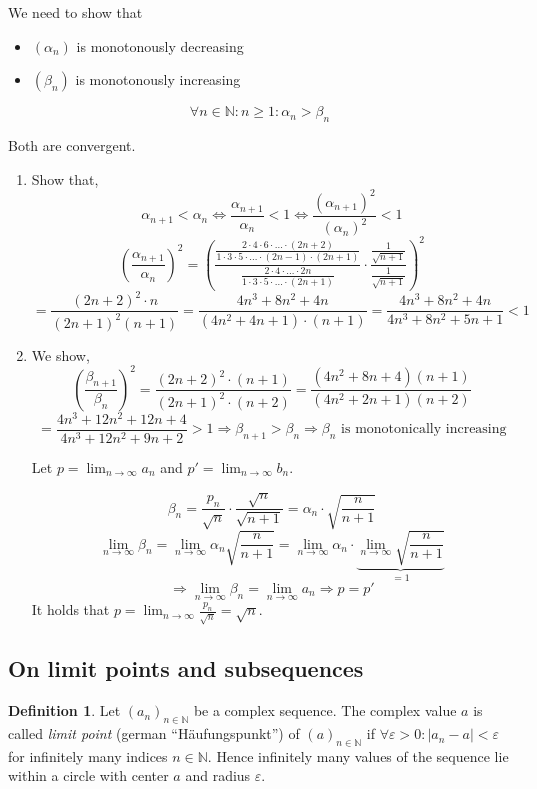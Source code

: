 \documentclass[a4paper,landscape,twocolumn]{article}
\theoremstyle{definition}
\newtheorem{defi}{Definition}
\newcommand\abs[1]{\left|#1\right|}
\newcommand\seq[1]{{\left(#1\right)}_{n \in \mathbb N}}
\begin{document}
We need to show that
\begin{itemize}
  \item $(\alpha_n)$ is monotonously decreasing
  \item $(\beta_n)$ is monotonously increasing
\end{itemize}
\[ \forall n \in \mathbb N: n \geq 1: \alpha_n > \beta_n \]

Both are convergent.

\begin{enumerate}
  \item Show that,
    \[
        \alpha_{n+1} < \alpha_n \Leftrightarrow
        \frac{\alpha_{n+1}}{\alpha_n} < 1 \Leftrightarrow
        \frac{(\alpha_{n+1})^2}{(\alpha_n)^2} < 1
    \] \[
        \left(\frac{\alpha_{n+1}}{\alpha_n}\right)^2 = \left(
            \frac{\frac{2 \cdot 4 \cdot 6 \cdot \ldots \cdot (2n+2)}{1 \cdot 3 \cdot 5 \cdot \ldots \cdot (2n-1) \cdot (2n+1)}}%
            {\frac{2\cdot4\cdot \ldots \cdot 2n}{1 \cdot 3 \cdot 5 \cdot \ldots \cdot (2n+1)}}
            \cdot \frac{\frac{1}{\sqrt{n+1}}}{\frac{1}{\sqrt{n+1}}}
        \right)^2
    \] \[
        = \frac{(2n+2)^2 \cdot n}{(2n+1)^2 (n + 1)}
        = \frac{4n^3+8n^2+4n}{(4n^2 + 4n + 1)\cdot(n+1)}
        = \frac{4n^3+8n^2+4n}{4n^3+8n^2+5n+1}
        < 1
    \]
  \item We show,
    \[
        \left(\frac{\beta_{n+1}}{\beta_n}\right)^2
        = \frac{(2n+2)^2 \cdot (n+1)}{(2n+1)^2 \cdot (n+2)}
        = \frac{(4n^2 + 8n + 4) (n+1)}{(4n^2+2n+1) (n+2)}
    \] \[
        = \frac{4n^3+12n^2+12n+4}{4n^3 + 12n^2 + 9n + 2}
        > 1 \Rightarrow \beta_{n+1} > \beta_n \Rightarrow \beta_n \text{ is monotonically increasing}
    \]

    Let $p = \lim_{n\to\infty} a_n$ and $p' = \lim_{n\to\infty} b_n$.

    \[ \beta_n = \frac{p_n}{\sqrt{n}} \cdot \frac{\sqrt{n}}{\sqrt{n+1}} = \alpha_n \cdot \sqrt{\frac{n}{n+1}} \]
    \[ \lim_{n\to\infty} \beta_n = \lim_{n\to\infty} \alpha_n \sqrt{\frac{n}{n+1}} = \lim_{n\to\infty} \alpha_n \cdot \underbrace{\lim_{n\to\infty} \sqrt{\frac{n}{n+1}}}_{=1} \]
    \[ \Rightarrow \lim_{n\to\infty} \beta_n = \lim_{n\to\infty} a_n \Rightarrow p = p' \]
    It holds that $p = \lim_{n\to\infty} \frac{p_n}{\sqrt{n}} = \sqrt{n}$.
\end{enumerate}

\subsection{On limit points and subsequences}
%
\begin{defi}
  Let $\seq{a_n}$ be a complex sequence.
  The complex value $a$ is called \emph{limit point} (german \enquote{\foreignlanguage{ngerman}{Häufungspunkt}})
  of $\seq{a}$ if $\forall \varepsilon > 0: \abs{a_n - a} < \varepsilon$ for infinitely many indices $n \in \mathbb N$.
  Hence infinitely many values of the sequence lie within a circle with center $a$ and radius $\varepsilon$.
\end{defi}
\end{document}
